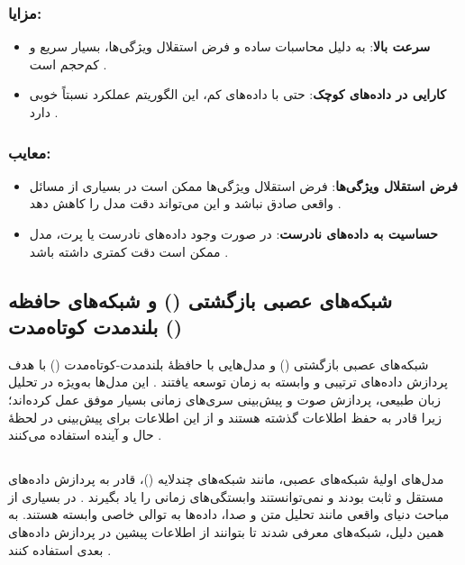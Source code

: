 \subsubsection{مزایا:}
\begin{itemize}
	\item \textbf{سرعت بالا}: به دلیل محاسبات ساده و فرض استقلال ویژگی‌ها،  بسیار سریع و کم‌حجم است
	\cite{mccallum1998comparison}.
	\item \textbf{کارایی در داده‌های کوچک}: حتی با داده‌های کم، این الگوریتم عملکرد نسبتاً خوبی دارد
	\cite{murphy2012machine}.
\end{itemize}

\subsubsection{معایب:}
\begin{itemize}
	\item \textbf{فرض استقلال ویژگی‌ها}: فرض استقلال ویژگی‌ها ممکن است در بسیاری از مسائل واقعی صادق نباشد و این می‌تواند دقت مدل را کاهش دهد
	\cite{domingos1997optimal}.
	\item \textbf{حساسیت به داده‌های نادرست}: در صورت وجود داده‌های نادرست یا پرت، مدل ممکن است دقت کمتری داشته باشد
	\cite{bishop2006pattern}.
\end{itemize}


\subsection{شبکه‌های عصبی بازگشتی () و شبکه‌های حافظه بلندمدت کوتاه‌مدت ()}
شبکه‌های عصبی بازگشتی () و مدل‌هایی با حافظهٔ بلندمدت-کوتاه‌مدت ()
با هدف پردازش داده‌های ترتیبی و وابسته به زمان توسعه یافتند
\cite{rumelhart1986learning,hochreiter1997long}.
این مدل‌ها به‌ویژه در تحلیل زبان طبیعی، پردازش صوت و پیش‌بینی سری‌های زمانی بسیار موفق عمل کرده‌اند؛ زیرا قادر به حفظ اطلاعات گذشته هستند و از این اطلاعات برای پیش‌بینی در لحظهٔ حال و آینده استفاده می‌کنند
\cite{gers1999learning}.

\subsection{}
مدل‌های اولیهٔ شبکه‌های عصبی، مانند شبکه‌های چندلایه ()، قادر به پردازش داده‌های مستقل و ثابت بودند و نمی‌توانستند وابستگی‌های زمانی را یاد بگیرند
\cite{bishop2006pattern}.
در بسیاری از مباحث دنیای واقعی مانند تحلیل متن و صدا، داده‌ها به توالی خاصی وابسته هستند. به همین دلیل، شبکه‌های  معرفی شدند تا بتوانند از اطلاعات پیشین در پردازش داده‌های بعدی استفاده کنند
\cite{rumelhart1986learning}.

